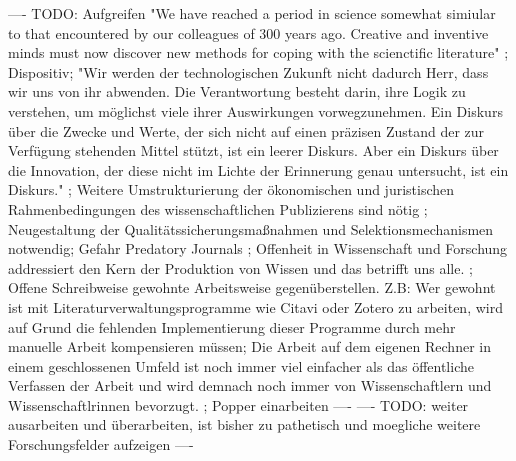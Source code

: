---- TODO: Aufgreifen "We have reached a period in science somewhat simiular to that encountered by our colleagues of 300 years ago. Creative and inventive minds must now discover new methods for coping with the scienctific literature" \cite{porter_1964_scientific}; Dispositiv; "Wir werden der technologischen Zukunft nicht dadurch Herr, dass wir uns von ihr abwenden. Die Verantwortung besteht darin, ihre Logik zu verstehen, um möglichst viele ihrer Auswirkungen vorwegzunehmen. Ein Diskurs über die Zwecke und Werte, der sich nicht auf einen präzisen Zustand der zur Verfügung stehenden Mittel stützt, ist ein leerer Diskurs. Aber ein Diskurs über die Innovation, der diese nicht im Lichte der Erinnerung genau untersucht, ist ein Diskurs." \cite{naeder_2010_open}; Weitere Umstrukturierung der ökonomischen und juristischen Rahmenbedingungen des wissenschaftlichen Publizierens sind nötig \cite{naeder_2010_open};  Neugestaltung der Qualitätssicherungsmaßnahmen und Selektionsmechanismen notwendig; Gefahr Predatory Journals \cite{Beall_2012}; Offenheit in Wissenschaft und Forschung addressiert den Kern der Produktion von Wissen und das betrifft uns alle. \cite{Mussell_2013}; Offene Schreibweise gewohnte Arbeitsweise gegenüberstellen. Z.B: Wer gewohnt ist mit Literaturverwaltungsprogramme wie Citavi oder Zotero zu arbeiten, wird auf Grund die fehlenden Implementierung dieser Programme  durch mehr manuelle Arbeit kompensieren müssen; Die Arbeit auf dem eigenen Rechner in einem geschlossenen Umfeld ist noch immer viel einfacher als das öffentliche Verfassen der Arbeit und wird demnach noch immer von Wissenschaftlern und Wissenschaftlrinnen bevorzugt. ; Popper einarbeiten ----
---- TODO: weiter ausarbeiten und überarbeiten, ist bisher zu pathetisch und moegliche weitere Forschungsfelder aufzeigen ----
